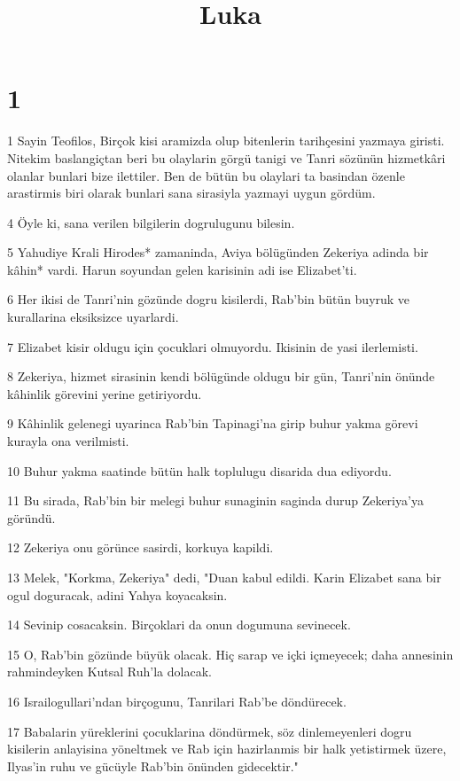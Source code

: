 

\title{Luka}


\chapter{1}

\par 1 Sayin Teofilos, Birçok kisi aramizda olup bitenlerin tarihçesini yazmaya giristi. Nitekim baslangiçtan beri bu olaylarin görgü tanigi ve Tanri sözünün hizmetkâri olanlar bunlari bize ilettiler. Ben de bütün bu olaylari ta basindan özenle arastirmis biri olarak bunlari sana sirasiyla yazmayi uygun gördüm.
\par 4 Öyle ki, sana verilen bilgilerin dogrulugunu bilesin.
\par 5 Yahudiye Krali Hirodes* zamaninda, Aviya bölügünden Zekeriya adinda bir kâhin* vardi. Harun soyundan gelen karisinin adi ise Elizabet'ti.
\par 6 Her ikisi de Tanri'nin gözünde dogru kisilerdi, Rab'bin bütün buyruk ve kurallarina eksiksizce uyarlardi.
\par 7 Elizabet kisir oldugu için çocuklari olmuyordu. Ikisinin de yasi ilerlemisti.
\par 8 Zekeriya, hizmet sirasinin kendi bölügünde oldugu bir gün, Tanri'nin önünde kâhinlik görevini yerine getiriyordu.
\par 9 Kâhinlik gelenegi uyarinca Rab'bin Tapinagi'na girip buhur yakma görevi kurayla ona verilmisti.
\par 10 Buhur yakma saatinde bütün halk toplulugu disarida dua ediyordu.
\par 11 Bu sirada, Rab'bin bir melegi buhur sunaginin saginda durup Zekeriya'ya göründü.
\par 12 Zekeriya onu görünce sasirdi, korkuya kapildi.
\par 13 Melek, "Korkma, Zekeriya" dedi, "Duan kabul edildi. Karin Elizabet sana bir ogul doguracak, adini Yahya koyacaksin.
\par 14 Sevinip cosacaksin. Birçoklari da onun dogumuna sevinecek.
\par 15 O, Rab'bin gözünde büyük olacak. Hiç sarap ve içki içmeyecek; daha annesinin rahmindeyken Kutsal Ruh'la dolacak.
\par 16 Israilogullari'ndan birçogunu, Tanrilari Rab'be döndürecek.
\par 17 Babalarin yüreklerini çocuklarina döndürmek, söz dinlemeyenleri dogru kisilerin anlayisina yöneltmek ve Rab için hazirlanmis bir halk yetistirmek üzere, Ilyas'in ruhu ve gücüyle Rab'bin önünden gidecektir."
